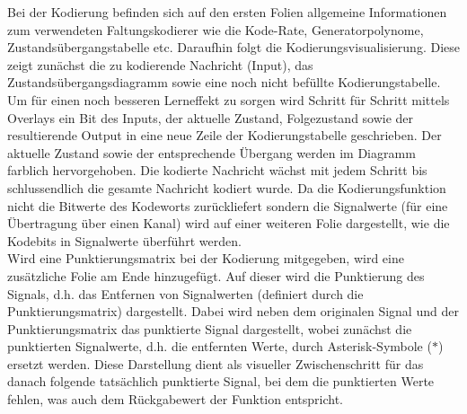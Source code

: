 Bei der Kodierung befinden sich auf den ersten Folien allgemeine Informationen zum verwendeten Faltungskodierer wie die Kode-Rate, Generatorpolynome, Zustandsübergangstabelle etc. 
Daraufhin folgt die Kodierungsvisualisierung. Diese zeigt zunächst die zu kodierende Nachricht (Input), das Zustandsübergangsdiagramm sowie eine noch nicht befüllte Kodierungstabelle. Um für einen noch besseren Lerneffekt zu sorgen wird Schritt für Schritt mittels Overlays ein Bit des Inputs, der aktuelle Zustand, Folgezustand sowie der resultierende Output in eine neue Zeile der Kodierungstabelle geschrieben. Der aktuelle Zustand sowie der entsprechende Übergang werden im Diagramm farblich hervorgehoben. Die kodierte Nachricht wächst mit jedem Schritt bis schlussendlich die gesamte Nachricht kodiert wurde.
Da die Kodierungsfunktion nicht die Bitwerte des Kodeworts zurückliefert sondern die Signalwerte (für eine Übertragung über einen Kanal) wird auf einer weiteren Folie dargestellt, wie die Kodebits in Signalwerte überführt werden.\\
Wird eine Punktierungsmatrix bei der Kodierung mitgegeben, wird eine zusätzliche Folie am Ende hinzugefügt. Auf dieser wird die Punktierung des Signals, d.h. das Entfernen von Signalwerten (definiert durch die Punktierungsmatrix) dargestellt. Dabei wird neben dem originalen Signal und der Punktierungsmatrix das punktierte Signal dargestellt, wobei zunächst die punktierten Signalwerte, d.h. die entfernten Werte, durch Asterisk-Symbole ($\ast$) ersetzt werden. Diese Darstellung dient als visueller Zwischenschritt für das danach folgende tatsächlich punktierte Signal, bei dem die punktierten Werte fehlen, was auch dem Rückgabewert der Funktion entspricht.

